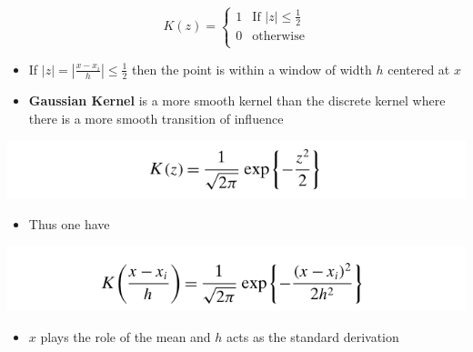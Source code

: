 \documentclass[11pt]{article}
\begin{document}
\begin{equation}
  	K(z) =
  		\begin{cases}
  			\mbox{$1$} & \mbox{If $|z| \leq \frac12$} \\
  			\mbox{$0$} & \mbox{otherwise} \\
  		\end{cases}
\end{equation}
\begin{itemize}
\item If \(|z| = |\frac{x-x_i}h| \leq \frac12\) then the point is within a window of width \(h\) centered at \(x\)

\item \textbf{Gaussian Kernel} is a more smooth kernel than the discrete kernel where there is a more smooth transition of influence
\end{itemize}
\begin{center}
\includegraphics[width=.9\linewidth]{Density-based Clustering/screenshot_2018-12-01_12-33-28.png}
\end{center}
\begin{itemize}
\item Thus one have
\end{itemize}
\begin{center}
\includegraphics[width=.9\linewidth]{Density-based Clustering/screenshot_2018-12-01_12-33-17.png}
\end{center}
\begin{itemize}
\item \(x\) plays the role of the mean and \(h\) acts as the standard derivation
\end{itemize}
\end{document}
